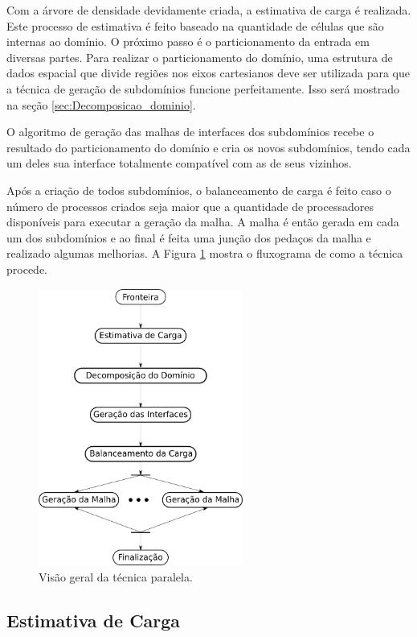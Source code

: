 Com a árvore de densidade devidamente criada, a estimativa de carga é realizada. Este processo de estimativa é feito baseado na quantidade de células que são internas ao domínio. O próximo passo é o particionamento da entrada em diversas partes. Para realizar o particionamento do domínio, uma estrutura de dados espacial que divide regiões nos eixos cartesianos deve ser utilizada para que a técnica de geração de subdomínios funcione perfeitamente. Isso será mostrado na seção \ref{sec:Decomposicao_dominio}.

O algoritmo de geração das malhas de interfaces dos subdomínios recebe o resultado do particionamento do domínio e cria os novos subdomínios, tendo cada um deles sua interface totalmente compatível com as de seus vizinhos.

Após a criação de todos subdomínios, o balanceamento de carga é feito caso o número de processos criados seja maior que a quantidade de processadores disponíveis para executar a geração da malha. A malha é então gerada em cada um dos subdomínios e ao final é feita uma junção dos pedaços da malha e realizado algumas melhorias. A Figura \ref{fig:fluxograma} mostra o fluxograma de como a técnica procede.

\begin{figure}[!ht]
	\centering
	\includegraphics[width=0.6\textwidth]{fig/fluxograma.png}
	\caption{Visão geral da técnica paralela.}
	\label{fig:fluxograma}
\end{figure}


\subsection{Estimativa de Carga} 
\label{sec:Estimativa_de_Carga}

